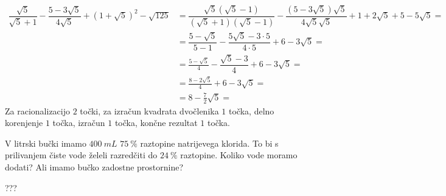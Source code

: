 \documentclass[addpoints]{exam}
\begin{document}
\begin{questions}
    \begin{solution}[7cm]
        \begin{align*} 
            \dfrac{\sqrt{5}}{\sqrt{5}+1}-\dfrac{5-3\sqrt{5}}{4\sqrt{5}}+\left(1+\sqrt{5}\right)^2-\sqrt{125}&=\dfrac{\sqrt{5}(\sqrt{5}-1)}{(\sqrt{5}+1)(\sqrt{5}-1)}-\dfrac{(5-3\sqrt{5})\sqrt{5}}{4\sqrt{5}\sqrt{5}}+1+2\sqrt{5}+5-5\sqrt{5}= \\
                                                                                                            &=\dfrac{5-\sqrt{5}}{5-1}-\dfrac{5\sqrt{5}-3\cdot 5}{4\cdot 5}+6-3\sqrt{5}= \\
                                                                                                            &=\frac{5-\sqrt{5}}{4}-\dfrac{\sqrt{5}-3}{4}+6-3\sqrt{5}= \\
                                                                                                            &=\frac{8-2\sqrt{5}}{4}+6-3\sqrt{5}= \\
                                                                                                            &=8-\frac{7}{2}\sqrt{5}= 
        \end{align*}
        Za racionalizacijo $2$ točki, za izračun kvadrata dvočlenika $1$ točka, delno korenjenje $1$ točka, izračun $1$ točka, končne rezultat $1$ točka.
    \end{solution}
    
    


    
    


    \question[4]
    V litrski bučki imamo $400~mL$ $75~\%$ raztopine natrijevega klorida. To bi s prilivanjem čiste vode želeli razredčiti do $24~\%$ raztopine.
    Koliko vode moramo dodati? Ali imamo bučko zadostne prostornine?
    
    \begin{solution}[3cm]
        ???
    \end{solution}



\end{questions}
\end{document}

